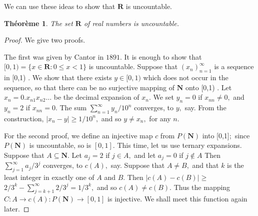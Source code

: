 \documentclass[12pt]{book}
\theoremstyle{definition}\newtheorem{dfn}{Définition}[chapter]
\theoremstyle{plain}\newtheorem{thm}{Théorème}[chapter]
\theoremstyle{plain}\newtheorem{prp}{Proposition}[chapter]
\theoremstyle{plain}\newtheorem{lem}{\bf Lemme}[chapter]
\theoremstyle{plain}\newtheorem{axm}{\bf Axiome}[chapter]
\theoremstyle{plain}\newtheorem{lmm}{\bf Lemme}[chapter]
\theoremstyle{plain}\newtheorem{exm}{\bf Example}[chapter]
\theoremstyle{plain}\newtheorem{cor}{\bf Corollaire}[chapter]
\theoremstyle{remark}\newtheorem{rem}{Remarque}[chapter]
\begin{document}
We can use these ideas to show that $\mathbf{R}$ is uncountable.
\begin{thm}
The set $\mathbf{R}$ of real numbers is uncountable.
\end{thm}
\begin{proof}
We give two proofs.

The first was given by Cantor in $1891 .$ It is enough to show that $[0,1)=\{x \in \mathbf{R}: 0 \leq x<1\}$ is uncountable. Suppose that $\left(x_{n}\right)_{n=1}^{\infty}$ is a sequence in [0,1) . We show that there exists $y \in[0,1)$ which does not occur in the sequence, so that there can be no surjective mapping of $\mathbf{N}$ onto [0,1) . Let $x_{n}=0 . x_{n 1} x_{n 2} \ldots$ be the decimal expansion of $x_{n} .$ We set $y_{n}=0$ if $x_{n n} \neq 0,$ and $y_{n}=2$ if $x_{n n}=0 .$ The sum $\sum_{n=1}^{\infty} y_{n} / 10^{n}$ converges, to $y,$ say. From the construction, $\left|x_{n}-y\right| \geq 1 / 10^{n},$ and so $y \neq x_{n},$ for any $n$.

For the second proof, we define an injective map $c$ from $P(\mathbf{N})$ into [0,1]$;$ since $P(\mathbf{N})$ is uncountable, so is $[0,1] .$ This time, let us use ternary expansions. Suppose that $A \subseteq \mathbf{N}$. Let $a_{j}=2$ if $j \in A,$ and let $a_{j}=0$ if $j \notin A$ Then $\sum_{j=1}^{\infty} a_{j} / 3^{j}$ converges, to $c(A),$ say. Suppose that $A \neq B,$ and that $k$ is the least integer in exactly one of $A$ and $B .$ Then $|c(A)-c(B)| \geq$ $2 / 3^{k}-\sum_{j=k+1}^{\infty} 2 / 3^{j}=1 / 3^{k},$ and so $c(A) \neq c(B) .$ Thus the mapping
$C: A \rightarrow c(A): P(\mathbf{N}) \rightarrow[0,1]$ is injective. We shall meet this function again later.
\end{proof}
\end{document}
